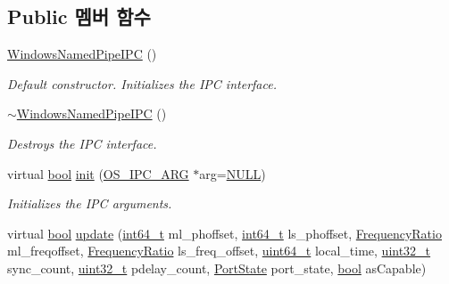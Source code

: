 \subsection*{Public 멤버 함수}
\begin{DoxyCompactItemize}
\item 
\hyperlink{class_windows_named_pipe_i_p_c_ad11fc025e4374007bb32549f29e0c7fa}{Windows\+Named\+Pipe\+I\+PC} ()
\begin{DoxyCompactList}\small\item\em Default constructor. Initializes the I\+PC interface. \end{DoxyCompactList}\item 
\hyperlink{class_windows_named_pipe_i_p_c_a84eadc1570bd0f1e7fe14c27dc0db69b}{$\sim$\+Windows\+Named\+Pipe\+I\+PC} ()
\begin{DoxyCompactList}\small\item\em Destroys the I\+PC interface. \end{DoxyCompactList}\item 
virtual \hyperlink{avb__gptp_8h_af6a258d8f3ee5206d682d799316314b1}{bool} \hyperlink{class_windows_named_pipe_i_p_c_a3f2ac4a024622c2fb268421b894ac12a}{init} (\hyperlink{class_o_s___i_p_c___a_r_g}{O\+S\+\_\+\+I\+P\+C\+\_\+\+A\+RG} $\ast$arg=\hyperlink{openavb__types__base__pub_8h_a070d2ce7b6bb7e5c05602aa8c308d0c4}{N\+U\+LL})
\begin{DoxyCompactList}\small\item\em Initializes the I\+PC arguments. \end{DoxyCompactList}\item 
virtual \hyperlink{avb__gptp_8h_af6a258d8f3ee5206d682d799316314b1}{bool} \hyperlink{class_windows_named_pipe_i_p_c_a175923e80a0786436a04468631e6477c}{update} (\hyperlink{parse_8c_a67a9885ef4908cb72ce26d75b694386c}{int64\+\_\+t} ml\+\_\+phoffset, \hyperlink{parse_8c_a67a9885ef4908cb72ce26d75b694386c}{int64\+\_\+t} ls\+\_\+phoffset, \hyperlink{ptptypes_8hpp_a84de47dc2ed889ecd2b61706d3ad0f2e}{Frequency\+Ratio} ml\+\_\+freqoffset, \hyperlink{ptptypes_8hpp_a84de47dc2ed889ecd2b61706d3ad0f2e}{Frequency\+Ratio} ls\+\_\+freq\+\_\+offset, \hyperlink{parse_8c_aec6fcb673ff035718c238c8c9d544c47}{uint64\+\_\+t} local\+\_\+time, \hyperlink{parse_8c_a6eb1e68cc391dd753bc8ce896dbb8315}{uint32\+\_\+t} sync\+\_\+count, \hyperlink{parse_8c_a6eb1e68cc391dd753bc8ce896dbb8315}{uint32\+\_\+t} pdelay\+\_\+count, \hyperlink{ptptypes_8hpp_a679431f1afc75d7bb9e972c022e53672}{Port\+State} port\+\_\+state, \hyperlink{avb__gptp_8h_af6a258d8f3ee5206d682d799316314b1}{bool} as\+Capable)

\end{DoxyCompactItemize}
